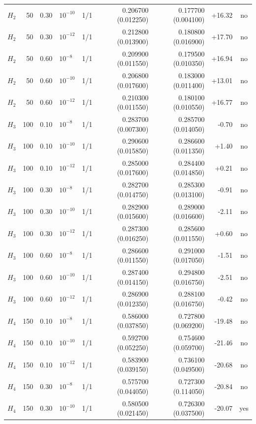 \begin{longtable}{lrrlrrrrc}
$H_2$ & 50 & 0.30 & $10^{-10}$ & 1/1 & 0.206700 (0.012250) & 0.177700 (0.004100) & +16.32 & no\\
$H_2$ & 50 & 0.30 & $10^{-12}$ & 1/1 & 0.212800 (0.013900) & 0.180800 (0.016900) & +17.70 & no\\
$H_2$ & 50 & 0.60 & $10^{-8}$ & 1/1 & 0.209900 (0.011550) & 0.179500 (0.010350) & +16.94 & no\\
$H_2$ & 50 & 0.60 & $10^{-10}$ & 1/1 & 0.206800 (0.017600) & 0.183000 (0.011400) & +13.01 & no\\
$H_2$ & 50 & 0.60 & $10^{-12}$ & 1/1 & 0.210300 (0.011550) & 0.180100 (0.010550) & +16.77 & no\\
$H_3$ & 100 & 0.10 & $10^{-8}$ & 1/1 & 0.283700 (0.007300) & 0.285700 (0.014050) & -0.70 & no\\
$H_3$ & 100 & 0.10 & $10^{-10}$ & 1/1 & 0.290600 (0.015850) & 0.286600 (0.011350) & +1.40 & no\\
$H_3$ & 100 & 0.10 & $10^{-12}$ & 1/1 & 0.285000 (0.017600) & 0.284400 (0.014850) & +0.21 & no\\
$H_3$ & 100 & 0.30 & $10^{-8}$ & 1/1 & 0.282700 (0.014750) & 0.285300 (0.013100) & -0.91 & no\\
$H_3$ & 100 & 0.30 & $10^{-10}$ & 1/1 & 0.282900 (0.015600) & 0.289000 (0.016600) & -2.11 & no\\
$H_3$ & 100 & 0.30 & $10^{-12}$ & 1/1 & 0.287300 (0.016250) & 0.285600 (0.011550) & +0.60 & no\\
$H_3$ & 100 & 0.60 & $10^{-8}$ & 1/1 & 0.286600 (0.011550) & 0.291000 (0.017050) & -1.51 & no\\
$H_3$ & 100 & 0.60 & $10^{-10}$ & 1/1 & 0.287400 (0.014150) & 0.294800 (0.016750) & -2.51 & no\\
$H_3$ & 100 & 0.60 & $10^{-12}$ & 1/1 & 0.286900 (0.012350) & 0.288100 (0.016750) & -0.42 & no\\
$H_4$ & 150 & 0.10 & $10^{-8}$ & 1/1 & 0.586000 (0.037850) & 0.727800 (0.069200) & -19.48 & no\\
$H_4$ & 150 & 0.10 & $10^{-10}$ & 1/1 & 0.592700 (0.052250) & 0.754600 (0.059700) & -21.46 & no\\
$H_4$ & 150 & 0.10 & $10^{-12}$ & 1/1 & 0.583900 (0.039150) & 0.736100 (0.049500) & -20.68 & no\\
$H_4$ & 150 & 0.30 & $10^{-8}$ & 1/1 & 0.575700 (0.044050) & 0.727300 (0.114050) & -20.84 & no\\
$H_4$ & 150 & 0.30 & $10^{-10}$ & 1/1 & 0.580500 (0.021450) & 0.726300 (0.037500) & -20.07 & yes\\

\end{longtable}
